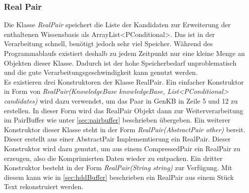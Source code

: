 \documentclass[12pt,a4paper]{article}
\begin{document}
\subsubsection{Real Pair}
\label{sec:realpair}
Die Klasse \textit{RealPair} speichert die Liste der Kandidaten zur Erweiterung der enthaltenen Wissensbasis als ArrayList<PConditional>. Das ist in der Verarbeitung schnell, benötigt jedoch sehr viel Speicher. Während des Programmablaufs existiert deshalb zu jedem Zeitpunkt nur eine kleine Menge an Objekten dieser Klasse. Dadurch ist der hohe Speicherbedarf unproblematisch und die gute Verarbeitungsgeschwindigkeit kann genutzt werden. \\
Es existieren drei Konstruktoren der Klasse RealPair. Ein einfacher Konstruktor in Form von \textit{RealPair(KnowledgeBase knowledgeBase, List<PConditional> candidates)} wird dazu verwendet, um das Paar in GenKB in Zeile 5 und 12 zu erstellen. In dieser Form wird das RealPair Objekt dann zur Weiterverarbeitung im PairBuffer wie unter \ref{sec:pairbuffer} beschrieben übergeben. Ein weiterer Konstruktor dieser Klasse steht in der Form \textit{RealPair(AbstractPair other)} bereit. Dieser erstellt aus einer AbstractPair Implememtierung ein RealPair. Dieser Konstruktor wird dazu genutzt, um aus einem CompressedPair ein RealPair zu erzeugen, also die Komprimierten Daten wieder zu entpacken. Ein dritter Konstruktor besteht in der Form \textit{RealPair(String string)} zur Verfügung. Mit diesem kann wie in \autoref{sec:hddBuffer} beschrieben ein RealPair aus einem Stück Text rekonstruiert werden.
\end{document}
